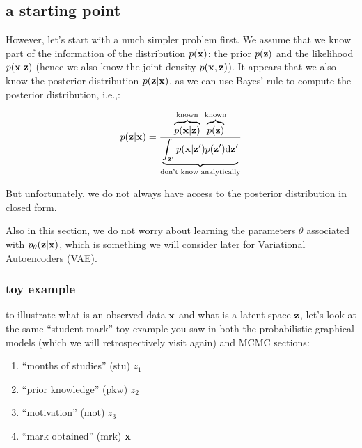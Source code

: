 \documentclass{article}
\begin{document}
\subsection{a starting point}

However, let's start with a much simpler problem first. We assume that we know part of the information of the distribution $p({\mathbf x})$: the prior $p({\mathbf z})$ and the likelihood $p({\mathbf x} | {\mathbf z})$ (hence we also know the joint density $p({\mathbf x},{\mathbf z})$). It appears that we also know the posterior distribution $p({\mathbf z} | {\mathbf x})$, as we can use Bayes' rule to compute the posterior distribution, i.e.,:

\begin{equation}\begin{split}
p({\mathbf z} | {\mathbf x}) = \frac{\overbrace{p({\mathbf x} | {\mathbf z})}^{\text{known}}\; \overbrace{p({\mathbf z})}^{\text{known}}}{\underbrace{\int_{{\mathbf z}'} p({\mathbf x}|{\mathbf z}') p({\mathbf z}') \text{d} {\mathbf z}'}_{\text{don't know analytically}} }
\end{split}\end{equation}

But unfortunately, we do not always have access to the posterior distribution in closed form.

Also in this section, we do not worry about learning the parameters $\theta$ associated with $p_\theta({\mathbf z} | {\mathbf x})$, which is something we will consider later for Variational Autoencoders (VAE).

\subsubsection{toy example}

to illustrate what is an observed data ${\mathbf x}$ and what is a latent space ${\mathbf z}$, let's look at the same ``student mark'' toy example you saw in both the probabilistic graphical models (which we will retrospectively visit again) and MCMC sections:

\begin{enumerate}
\item
``months of studies'' (stu)  $z_1$
\item
``prior knowledge'' (pkw) $z_2$
\item
``motivation'' (mot)  $z_3$
\item
``mark obtained'' (mrk) ${\mathbf x}$
\end{enumerate}

\begin{center}
\end{center}
\end{document}
